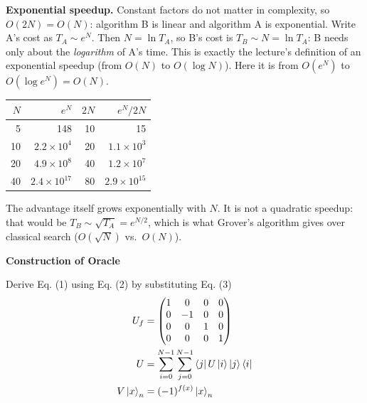 \documentclass[a4paper, 10pt]{article}
\begin{document}
\begin{solution}
	\noindent \textbf{Exponential speedup.} Constant factors do not matter in complexity, so \( O(2N) = O(N) \): algorithm B is linear and algorithm A is exponential.
	Write A's cost as \( T_A \sim e^N \). Then \( N = \ln T_A \), so B's cost is \( T_B \sim N = \ln T_A \): B needs only about the \emph{logarithm} of A's time.
	This is exactly the lecture's definition of an exponential speedup (from \( O(N) \) to \( O(\log N) \)). Here it is from \( O(e^N) \) to \( O(\log e^N) = O(N) \).
	\begin{center}
		\begin{tabular}{rrrr}
			\toprule
			\( N \) & \( e^N \)                & \( 2N \) & \( e^N / 2N \)           \\
			\midrule
			5       & 148                      & 10       & 15                       \\
			10      & \( 2.2 \times 10^{4} \)  & 20       & \( 1.1 \times 10^{3} \)  \\
			20      & \( 4.9 \times 10^{8} \)  & 40       & \( 1.2 \times 10^{7} \)  \\
			40      & \( 2.4 \times 10^{17} \) & 80       & \( 2.9 \times 10^{15} \) \\
			\bottomrule
		\end{tabular}
	\end{center}
	The advantage itself grows exponentially with \( N \). It is not a quadratic speedup: that would be \( T_B \sim \sqrt{T_A} = e^{N/2} \), which is what Grover's algorithm gives over classical search (\( O(\sqrt{N}) \) vs.\ \( O(N) \)).
\end{solution}

\begin{problem}
\textbf{Construction of Oracle}
\par Derive Eq. (1) using Eq. (2) by substituting Eq. (3)
\begin{align}
	U_f        & = \begin{pmatrix}
		               1 & 0  & 0 & 0 \\
		               0 & -1 & 0 & 0 \\
		               0 & 0  & 1 & 0 \\
		               0 & 0  & 0 & 1
	               \end{pmatrix}                                                              \\
	U          & = \sum_{i = 0}^{N - 1} \sum_{j = 0}^{N - 1} \bra{j} U \ket{i} \ket{j} \bra{i} \\
	V\ket{x}_n & = (-1)^{f(x)} \ket{x}_n
\end{align}
\end{problem}
\end{document}
